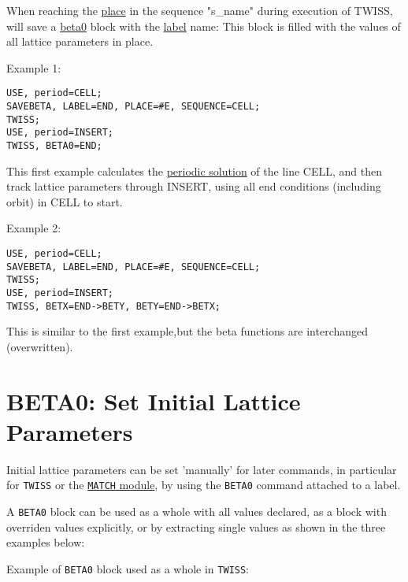 When reaching the \href{../control/general.html#place}{place} in the
sequence "s\_name" during execution of TWISS, \madx will save a
\hyperlink{beta0}{beta0} block with the
\href{../Introduction/label.html}{label} name: This block is filled with
the values of all lattice parameters in place.  

Example 1: 
\begin{verbatim}
USE, period=CELL;
SAVEBETA, LABEL=END, PLACE=#E, SEQUENCE=CELL;
TWISS;
USE, period=INSERT;
TWISS, BETA0=END;
\end{verbatim}
This first example calculates the \hyperlink{periodic}{periodic
  solution} of the line CELL, and then track lattice parameters through
INSERT, using all end conditions (including orbit) in CELL to start.  

Example 2: 
\begin{verbatim}
USE, period=CELL;
SAVEBETA, LABEL=END, PLACE=#E, SEQUENCE=CELL;
TWISS;
USE, period=INSERT;
TWISS, BETX=END->BETY, BETY=END->BETX;
\end{verbatim}
This is similar to the first example,but the beta functions are interchanged (overwritten).  

\section{BETA0: Set Initial Lattice Parameters}
\label{sec:beta0}
Initial lattice parameters can be set 'manually' for later commands, in
particular for {\tt TWISS} or the \href{../match/match.html}{{\tt MATCH} 
module}, by
using the {\tt BETA0} command attached to a label.  


A {\tt BETA0} block can be used as a whole with all values declared,
as a block with overriden values explicitly, or by extracting single
values as shown in the three examples below:

Example of {\tt BETA0} block used as a whole in {\tt TWISS}: 

